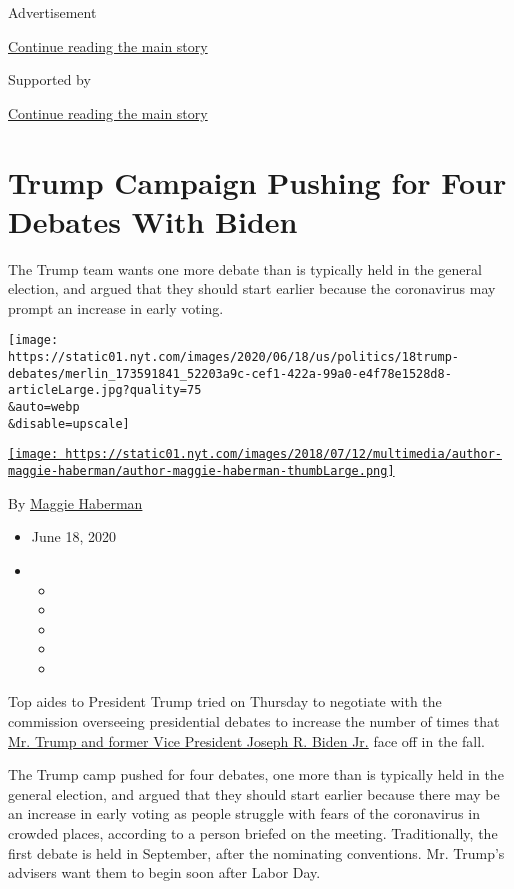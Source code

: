 Advertisement

\protect\hyperlink{after-top}{Continue reading the main story}

Supported by

\protect\hyperlink{after-sponsor}{Continue reading the main story}

\hypertarget{trump-campaign-pushing-for-four-debates-with-biden}{%
\section{Trump Campaign Pushing for Four Debates With
Biden}\label{trump-campaign-pushing-for-four-debates-with-biden}}

The Trump team wants one more debate than is typically held in the
general election, and argued that they should start earlier because the
coronavirus may prompt an increase in early voting.

\texttt{[image: https://static01.nyt.com/images/2020/06/18/us/politics/18trump-debates/merlin\_173591841\_52203a9c-cef1-422a-99a0-e4f78e1528d8-articleLarge.jpg?quality=75\\\&auto=webp\\\&disable=upscale]}

\href{https://www.nytimes.com/by/maggie-haberman}{\texttt{[image: https://static01.nyt.com/images/2018/07/12/multimedia/author-maggie-haberman/author-maggie-haberman-thumbLarge.png]}}

By \href{https://www.nytimes.com/by/maggie-haberman}{Maggie Haberman}

\begin{itemize}
\item
  June 18, 2020
\item
  \begin{itemize}
  \item
  \item
  \item
  \item
  \item
  \end{itemize}
\end{itemize}

Top aides to President Trump tried on Thursday to negotiate with the
commission overseeing presidential debates to increase the number of
times that
\href{https://www.nytimes.com/2020/06/19/us/politics/donald-trump-joe-biden-coronavirus.html}{Mr.
Trump and former Vice President Joseph R. Biden Jr.} face off in the
fall.

The Trump camp pushed for four debates, one more than is typically held
in the general election, and argued that they should start earlier
because there may be an increase in early voting as people struggle with
fears of the coronavirus in crowded places, according to a person
briefed on the meeting. Traditionally, the first debate is held in
September, after the nominating conventions. Mr. Trump's advisers want
them to begin soon after Labor Day.

